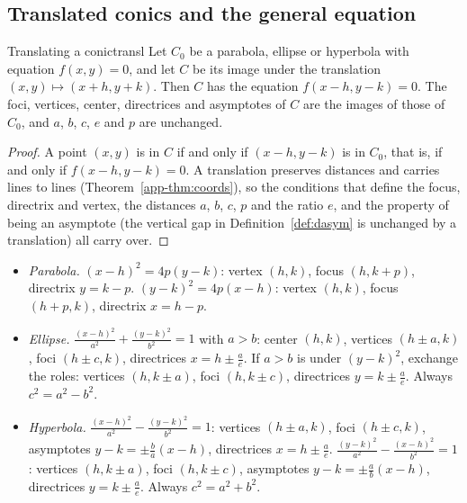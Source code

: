 \documentclass[11pt]{article}
\begin{document}
\subsection*{Translated conics and the general equation}

\begin{thm}{Translating a conic}{transl}
Let $C_0$ be a parabola, ellipse or hyperbola with equation $f(x,y)=0$, and let $C$ be its image under the translation $(x,y)\mapsto(x+h,y+k)$. Then $C$ has the equation $f(x-h,y-k)=0$. The foci, vertices, center, directrices and asymptotes of $C$ are the images of those of $C_0$, and $a$, $b$, $c$, $e$ and $p$ are unchanged.
\end{thm}
\begin{proof}
A point $(x,y)$ is in $C$ if and only if $(x-h,y-k)$ is in $C_0$, that is, if and only if $f(x-h,y-k)=0$. A translation preserves distances and carries lines to lines (Theorem~\ref{app-thm:coords}), so the conditions that define the focus, directrix and vertex, the distances $a$, $b$, $c$, $p$ and the ratio $e$, and the property of being an asymptote (the vertical gap in Definition~\ref{def:dasym} is unchanged by a translation) all carry over.
\end{proof}

\begin{remark}
\begin{itemize}[nosep]
  \item \emph{Parabola.} $(x-h)^2=4p(y-k)$: vertex $(h,k)$, focus $(h,k+p)$, directrix $y=k-p$. $(y-k)^2=4p(x-h)$: vertex $(h,k)$, focus $(h+p,k)$, directrix $x=h-p$.
  \item \emph{Ellipse.} $\frac{(x-h)^2}{a^2}+\frac{(y-k)^2}{b^2}=1$ with $a>b$: center $(h,k)$, vertices $(h\pm a,k)$, foci $(h\pm c,k)$, directrices $x=h\pm\frac ae$. If $a>b$ is under $(y-k)^2$, exchange the roles: vertices $(h,k\pm a)$, foci $(h,k\pm c)$, directrices $y=k\pm\frac ae$. Always $c^2=a^2-b^2$.
  \item \emph{Hyperbola.} $\frac{(x-h)^2}{a^2}-\frac{(y-k)^2}{b^2}=1$: vertices $(h\pm a,k)$, foci $(h\pm c,k)$, asymptotes $y-k=\pm\frac ba(x-h)$, directrices $x=h\pm\frac ae$. $\frac{(y-k)^2}{a^2}-\frac{(x-h)^2}{b^2}=1$: vertices $(h,k\pm a)$, foci $(h,k\pm c)$, asymptotes $y-k=\pm\frac ab(x-h)$, directrices $y=k\pm\frac ae$. Always $c^2=a^2+b^2$.
\end{itemize}
\end{remark}
\end{document}
